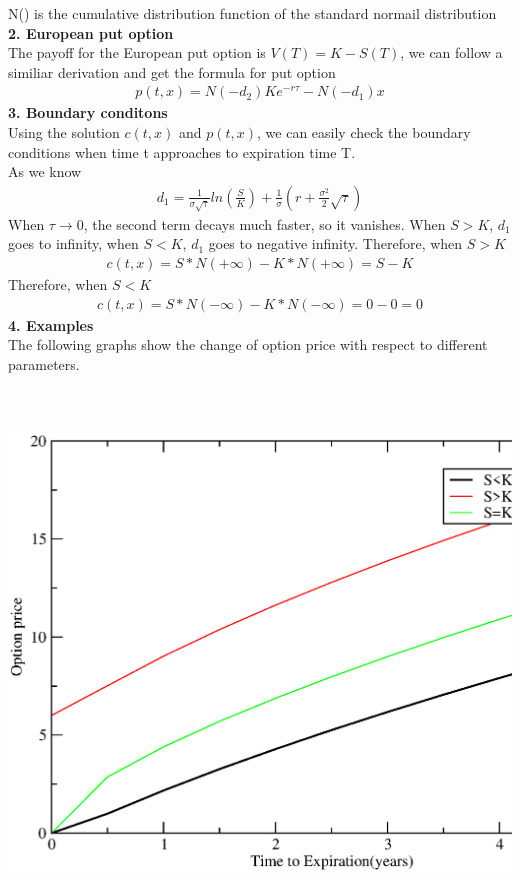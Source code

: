 \documentclass[a4paper]{article}
\begin{document}
N() is the cumulative distribution function of the standard normail distribution
{\bf 2. European put option}\\
The payoff for the European put option is $V(T) = K - S(T)$, we can follow a similiar derivation and get the formula for put option
\begin{align*}
	p(t,x) = N(-d_2)Ke^{-r\tau} -N(-d_1)x
\end{align*}
{\bf 3. Boundary conditons}\\
Using the solution $c(t,x)$ and $p(t,x)$, we can easily check the boundary conditions when
time t approaches to expiration time T.\\
As we know
\begin{align*}
	d_1 = \frac{1}{\sigma \sqrt{\tau}}ln(\frac{S}{K}) 
	+ \frac{1}{\sigma}(r+\frac{\sigma^2}{2}\sqrt{\tau})
\end{align*}
When $\tau \to 0$, the second term decays much faster, so it vanishes. When $S>K$, $d_1$ goes to infinity, when $S<K$, $d_1$ goes to negative infinity.
Therefore, when $S>K$
\begin{align*}
	c(t,x) = S*N(+\infty) - K*N(+\infty) = S-K
\end{align*}
Therefore, when $S<K$
\begin{align*}
	c(t,x) = S*N(-\infty) - K*N(-\infty) = 0-0 = 0
\end{align*}
{\bf 4. Examples}\\
The following graphs show the change of option price with respect to different parameters.
\\
\\
\\
\\
\includegraphics[scale = 0.5]{option_price1.eps}\\
\end{document}
